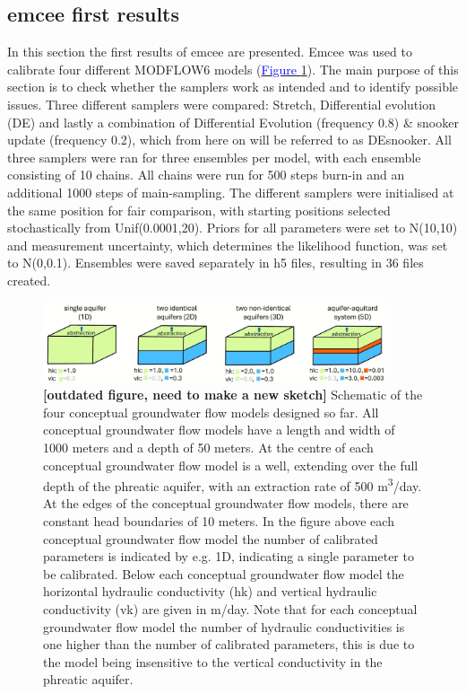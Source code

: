 \subsection{emcee first results}\label{emcee first results}
In this section the first results of emcee are presented. Emcee was used to calibrate four different MODFLOW6 models (\hyperref[fig_logbook_1.0_CONGROMO]{\textcolor{blue}{Figure }\ref{fig_logbook_1.0_CONGROMO}}). 
The main purpose of this section is to check whether the samplers work as intended and to identify possible issues. Three different samplers were compared: Stretch, Differential evolution (DE) and lastly a combination of Differential Evolution (frequency 0.8) \& snooker update (frequency 0.2), which from here on will be referred to as DEsnooker. All three samplers were ran for three ensembles per model, with each ensemble consisting of 10 chains. All chains were run for 500 steps burn-in and an additional 1000 steps of main-sampling. The different samplers were initialised at the same position for fair comparison, with starting positions selected stochastically from Unif(0.0001,20). Priors for all parameters were set to N(10,10) and measurement uncertainty, which determines the likelihood function, was set to N(0,0.1). Ensembles were saved separately in h5 files, resulting in 36 files created.   

\begin{figure}[H]
\centering
\includegraphics[width=0.9\textwidth]{Figures/appendix_figs/C.1.0 conceptual_groundwater_models_ppt.JPG}
\caption{\textbf{[outdated figure, need to make a new sketch]} Schematic of the four conceptual groundwater flow models designed so far. All conceptual groundwater flow models have a length and width of 1000 meters and a depth of 50 meters. At the centre of each conceptual groundwater flow model is a well, extending over the full depth of the phreatic aquifer, with an extraction rate of 500 m\textsuperscript{3}/day. At the edges of the conceptual groundwater flow models, there are constant head boundaries of 10 meters. In the figure above each conceptual groundwater flow model the number of calibrated parameters is indicated by e.g. 1D, indicating a single parameter to be calibrated. Below each conceptual groundwater flow model the horizontal hydraulic conductivity (hk) and vertical hydraulic conductivity (vk) are given in m/day. Note that for each conceptual groundwater flow model the number of hydraulic conductivities is one higher than the number of calibrated parameters, this is due to the model being insensitive to the vertical conductivity in the phreatic aquifer.}\label{fig_logbook_1.0_CONGROMO} %
\end{figure}

